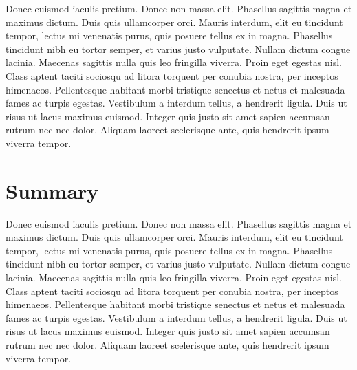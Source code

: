 \documentclass[format=acmsmall, review=false, screen=true]{acmart}
\begin{document}
Donec euismod iaculis pretium. Donec non massa elit. Phasellus sagittis magna et maximus dictum. Duis quis ullamcorper orci. Mauris interdum, elit eu tincidunt tempor, lectus mi venenatis purus, quis posuere tellus ex in magna. Phasellus tincidunt nibh eu tortor semper, et varius justo vulputate. Nullam dictum congue lacinia. Maecenas sagittis nulla quis leo fringilla viverra. Proin eget egestas nisl. Class aptent taciti sociosqu ad litora torquent per conubia nostra, per inceptos himenaeos. Pellentesque habitant morbi tristique senectus et netus et malesuada fames ac turpis egestas. Vestibulum a interdum tellus, a hendrerit ligula. Duis ut risus ut lacus maximus euismod. Integer quis justo sit amet sapien accumsan rutrum nec nec dolor. Aliquam laoreet scelerisque ante, quis hendrerit ipsum viverra tempor.

\section{Summary}

Donec euismod iaculis pretium. Donec non massa elit. Phasellus sagittis magna et maximus dictum. Duis quis ullamcorper orci. Mauris interdum, elit eu tincidunt tempor, lectus mi venenatis purus, quis posuere tellus ex in magna. Phasellus tincidunt nibh eu tortor semper, et varius justo vulputate. Nullam dictum congue lacinia. Maecenas sagittis nulla quis leo fringilla viverra. Proin eget egestas nisl. Class aptent taciti sociosqu ad litora torquent per conubia nostra, per inceptos himenaeos. Pellentesque habitant morbi tristique senectus et netus et malesuada fames ac turpis egestas. Vestibulum a interdum tellus, a hendrerit ligula. Duis ut risus ut lacus maximus euismod. Integer quis justo sit amet sapien accumsan rutrum nec nec dolor. Aliquam laoreet scelerisque ante, quis hendrerit ipsum viverra tempor.
\end{document}
